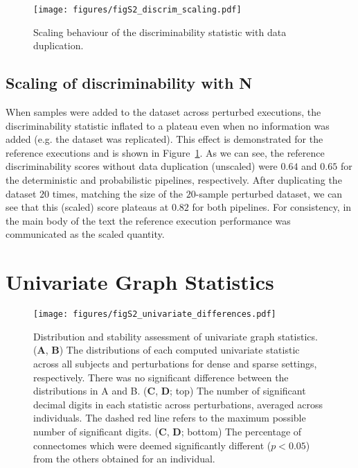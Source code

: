 \documentclass[fleqn,10pt]{SelfArx} %
\newcommand{\new}[1]{{#1}}
\begin{document}
\begin{figure}[ht]\centering
\texttt{[image: figures/figS2\_discrim\_scaling.pdf]}
\caption{Scaling behaviour of the discriminability statistic with data duplication.}
\label{fig:discrim_scaling}
\end{figure}

\subsection{Scaling of discriminability with N}
When samples were added to the dataset across perturbed executions, the discriminability statistic inflated to a
plateau even when no information was added (e.g. the dataset was replicated). This effect is demonstrated for the
reference executions and is shown in Figure~\ref{fig:discrim_scaling}. As we can see, the reference discriminability
scores without data duplication (unscaled) were $0.64$ and $0.65$ for the deterministic and probabilistic pipelines,
respectively. After duplicating the dataset $20$ times, matching the size of the $20$-sample perturbed dataset, we
can see that this (scaled) score plateaus at $0.82$ for both pipelines. For consistency, in the main body of the text
the reference execution performance was communicated as the scaled quantity.



\clearpage
\section{Univariate Graph Statistics}
\label{supsec:univar}

\begin{figure}[ht]\centering
\texttt{[image: figures/figS2\_univariate\_differences.pdf]}
\caption{Distribution and stability assessment of univariate graph statistics. (\textbf{A}, \textbf{B}) The
distributions of each computed univariate statistic across all subjects and perturbations for \new{dense} and \new{sparse}
settings, respectively. There was no significant difference between the distributions in A and B. (\textbf{C},
\textbf{D}; top) The number of significant decimal digits in each statistic across perturbations, averaged across
individuals. The dashed red line refers to the maximum possible number of significant digits.
(\textbf{C}, \textbf{D}; bottom) The percentage of connectomes which were deemed significantly different
($p < 0.05$) from the others obtained for an individual.}
\label{sfig:univariate}
\end{figure}
\end{document}
